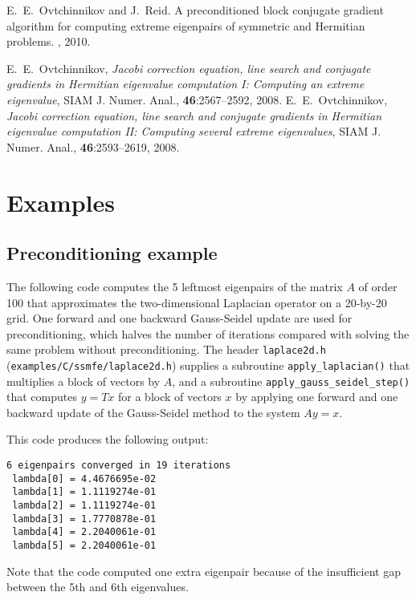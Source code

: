 
E.~E.~Ovtchinnikov and J.~Reid.
A preconditioned block conjugate gradient
algorithm for computing extreme eigenpairs
of symmetric and Hermitian problems.
\report, 2010.

E.~E.~Ovtchinnikov,
{\em Jacobi correction equation, line search and
conjugate gradients in Hermitian eigenvalue computation I:
Computing an extreme eigenvalue},
SIAM J. Numer. Anal., {\bf 46}:2567--2592, 2008.
E.~E.~Ovtchinnikov,
{\em Jacobi correction equation, line search and
conjugate gradients in Hermitian eigenvalue computation II:
Computing several extreme eigenvalues},
SIAM J. Numer. Anal., {\bf 46}:2593--2619, 2008.


\section{Examples}

\subsection{Preconditioning example}
\label{sec:ex.prec}

The following code 
computes the 5 leftmost eigenpairs of 
the matrix $A$ of order 100 that approximates 
the two-dimensional Laplacian operator
on a 20-by-20 grid.
One forward and one backward Gauss-Seidel update
are used for preconditioning,
which halves the number of iterations
compared with solving the same problem without preconditioning.
The header {\tt laplace2d.h} (\texttt{examples/C/ssmfe/laplace2d.h})
supplies a subroutine {\tt apply\_laplacian()}
that multiplies a block of vectors by $A$,
and a subroutine 
{\tt apply\_gauss\_seidel\_step()}
that computes $y = T x$ for a block of vectors $x$
by applying one forward and one backward update
of the Gauss-Seidel method to the system $A y = x$.

This code produces the following output:
\begin{verbatim}
6 eigenpairs converged in 19 iterations
 lambda[0] = 4.4676695e-02
 lambda[1] = 1.1119274e-01
 lambda[2] = 1.1119274e-01
 lambda[3] = 1.7770878e-01
 lambda[4] = 2.2040061e-01
 lambda[5] = 2.2040061e-01
\end{verbatim}

Note that the code computed one extra eigenpair
because of the insufficient gap between the 5th and 6th
eigenvalues.

